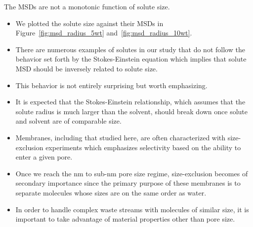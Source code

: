 \documentclass{article}
\begin{document}
  \noindent The MSDs are not a monotonic function of solute size.
  \begin{itemize}
  	\item We plotted the solute size against their MSDs in Figure~\ref{fig:msd_radius_5wt} and~\ref{fig:msd_radius_10wt}.
  	\item There are numerous examples of solutes in our study that do not 
  	follow the behavior set forth by the Stokes-Einstein equation which 
  	implies that solute MSD should be inversely related to solute size.  %
  	\item This behavior is not entirely surprising but worth emphasizing. 
  	\item It is expected that the Stokes-Einstein relationship, which assumes that 
  	the solute radius is much larger than the solvent, should break down once
  	solute and solvent are of comparable size.
  	\item Membranes, including that studied here, are often characterized 
  	with size-exclusion experiments which emphasizes selectivity based on the ability
  	to enter a given pore. 
  	\item Once we reach the nm to sub-nm pore size regime, size-exclusion 
  	becomes of secondary importance since the primary purpose of these membranes is to 
  	separate molecules whose sizes are on the same order as water.
  	\item In order to handle complex waste streams with molecules of similar size,
  	it is important to take advantage of material properties other than pore size. 
  \end{itemize}
  
\end{document}
